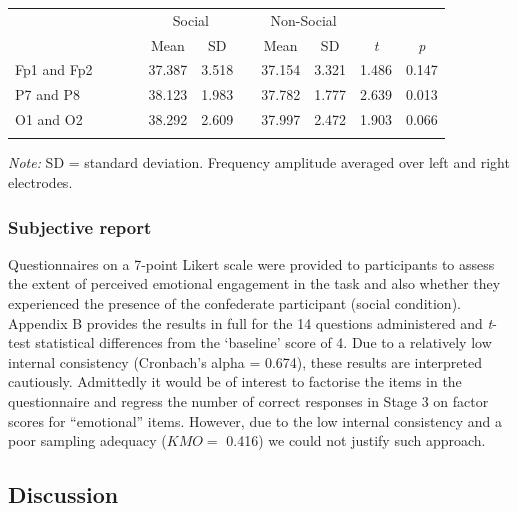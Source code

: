 \documentclass[]{elsarticle} %
\begin{document}
\begin{table}[!htbp]
 \label{tab:title}
\centering
\begin{tabular}{lcccccccccc}
\hline
&&&& \multicolumn{2}{c}{Social} & & \multicolumn{2}{c}{Non-Social}  &  \\\cline{5-6} \cline{8-9}
&&&& Mean & SD & & Mean  & SD  & \textit{t} & \textit{p} \\
\hline
Fp1 and Fp2 &&&& 37.387  & 3.518 & & 37.154 & 3.321  & 1.486 & 0.147  \\
P7 and P8 &&&& 38.123  & 1.983 & & 37.782 & 1.777  & 2.639 & 0.013  \\
O1 and O2 &&&& 38.292  & 2.609 & & 37.997 & 2.472  & 1.903 & 0.066  \\
\hline
\\
\end{tabular}
 {\raggedright \small{\textit{Note:} SD = standard deviation. Frequency amplitude averaged over left and right electrodes.} \par}
\end{table}

\hypertarget{subjective-report-1}{%
\subsubsection{Subjective report}\label{subjective-report-1}}

Questionnaires on a 7-point Likert scale were provided to participants
to assess the extent of perceived emotional engagement in the task and
also whether they experienced the presence of the confederate
participant (social condition). Appendix B provides the results in full
for the 14 questions administered and \emph{t}-test statistical
differences from the `baseline' score of 4. Due to a relatively low
internal consistency (Cronbach's alpha = 0.674), these results are
interpreted cautiously. Admittedly it would be of interest to factorise
the items in the questionnaire and regress the number of correct
responses in Stage 3 on factor scores for ``emotional'' items. However,
due to the low internal consistency and a poor sampling adequacy
(\(KMO=\) 0.416) we could not justify such approach.

\hypertarget{discussion-1}{%
\subsection{Discussion}\label{discussion-1}}
\end{document}
